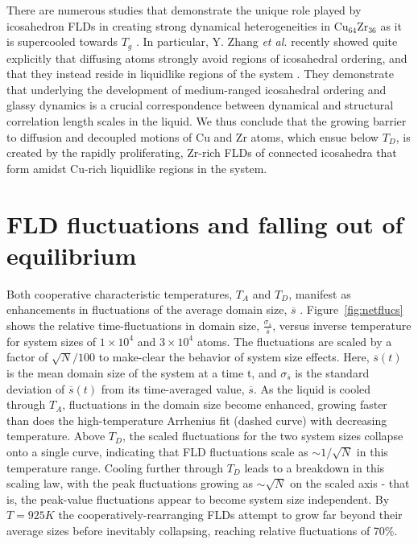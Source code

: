 \documentclass[aps,prl,preprint,showpacs,amsmath,floatfix,superscriptaddress]{revtex4}
\begin{document}
There are numerous studies that demonstrate the unique role played
by icosahedron FLDs in creating strong dynamical heterogeneities
in Cu$_{64}$Zr$_{36}$ as it is supercooled towards $T_{g}$
\cite{Cheng2008,Ding2014,Mendelev2015}. In particular, Y. Zhang
\textit{et al.} recently showed quite explicitly that diffusing
atoms strongly avoid regions of icosahedral ordering, and that
they instead reside in liquidlike regions of the system
\cite{Mendelev2015}. They demonstrate that underlying the development
of medium-ranged icosahedral ordering and glassy dynamics is a crucial correspondence between 
dynamical and structural correlation length scales in the liquid. 
We thus conclude that the growing barrier to
diffusion and decoupled motions of Cu and Zr atoms, which ensue
below $T_{D}$, is created by the rapidly proliferating, Zr-rich
FLDs of connected icosahedra that form amidst Cu-rich liquidlike
regions in the system.

\section{FLD fluctuations and falling out of equilibrium}

Both cooperative characteristic temperatures, $T_{A}$ and $T_{D}$,
manifest as enhancements in fluctuations of the average domain
size, $\overline{s}$ . Figure~\ref{fig:netflucs} shows the
relative time-fluctuations in domain size,
$\frac{\sigma_{\overline{s}}}{\overline{s}}$, versus inverse
temperature for system sizes of $1\times 10^{4}$ and $3\times
10^{4}$ atoms. The fluctuations are scaled by a factor of
$\sqrt{N}/100$ to make-clear the behavior of system size effects.
Here, $\overline{s}(t)$ is the mean domain size of the system at a
time t, and $\sigma_{\overline{s}}$ is the standard deviation of
$\overline{s}(t)$ from its time-averaged value, $\overline{s}$. As
the liquid is cooled through $T_{A}$, fluctuations in the domain
size become enhanced, growing faster than does the
high-temperature Arrhenius fit (dashed curve) with decreasing
temperature. Above $T_{D}$, the scaled fluctuations for the two
system sizes collapse onto a single curve, indicating that FLD
fluctuations scale as $\sim1/\sqrt{N}$ in this temperature range.
Cooling further through $T_{D}$ leads to a breakdown in this
scaling law, with the peak fluctuations growing as $\sim\sqrt{N}$
on the scaled axis - that is, the peak-value fluctuations appear
to become system size independent. By $T=925K$ the
cooperatively-rearranging FLDs attempt to grow far beyond their
average sizes before inevitably collapsing, reaching relative
fluctuations of 70\%.
\end{document}
